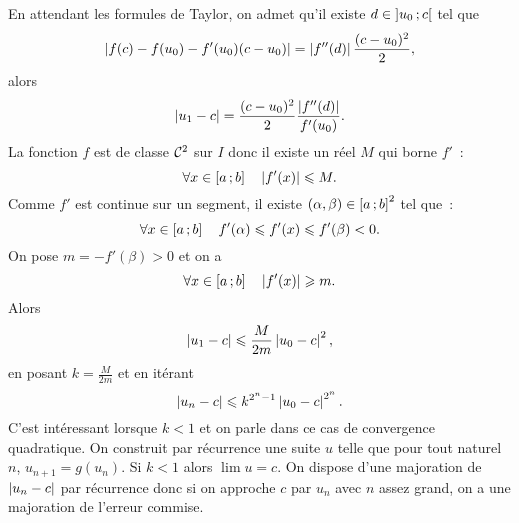 En attendant les formules de Taylor, on admet qu'il existe $d \in \left] u_0 \, ;  c \right[$ tel que
\begin{equation}
  \left\lvert f(c)-f(u_0)-f'(u_0)(c-u_0)\right\rvert = \left\lvert f''(d)\right\rvert\frac{(c-u_0)^2}{2},
\end{equation}
alors
\begin{equation}
  \left\lvert u_1-c\right\rvert = \frac{(c-u_0)^2}{2} \frac{\left\lvert f''(d)\right\rvert}{f'(u_0)}.
\end{equation}
La fonction $f$ est de classe $\mathcal{C}^{2}$ sur $I$ donc il existe un réel $M$ qui borne $f'$~:
\begin{equation}
  \forall x \in \left[ a \, ;  b \right] \quad \left\lvert f'(x)\right\rvert \leqslant M.
\end{equation}
Comme $f'$ est continue sur un segment, il existe $(\alpha,\beta) \in \left[ a \, ;  b \right]^2$ tel que~:
\begin{equation}
  \forall x \in \left[ a \, ;  b \right] \quad f'(\alpha) \leqslant f'(x) \leqslant f'(\beta) <0.
\end{equation}
On pose $m=-f'(\beta)>0$ et on a
\begin{equation}
  \forall x \in \left[ a \, ;  b \right] \quad \left\lvert f'(x)\right\rvert \geqslant m.
\end{equation}
Alors
\begin{equation}
  \left\lvert u_1-c\right\rvert \leqslant \frac{M}{2m} \left\lvert u_0-c\right\rvert^2,
\end{equation}
en posant $k=\frac{M}{2m}$ et en itérant
\begin{equation}
  \left\lvert u_n-c\right\rvert \leqslant k^{2^n-1} \left\lvert u_0-c\right\rvert^{2^n}.
\end{equation}
C'est intéressant lorsque $k < 1$ et on parle dans ce cas de convergence quadratique. On construit par récurrence une suite $u$ telle que pour tout naturel $n$, $u_{n+1}=g(u_n)$. Si $k<1$ alors $\lim u =c$. On dispose d'une majoration de $\left\lvert u_n-c\right\rvert$ par récurrence donc si on approche $c$ par $u_n$ avec $n$ assez grand, on a une majoration de l'erreur commise.

